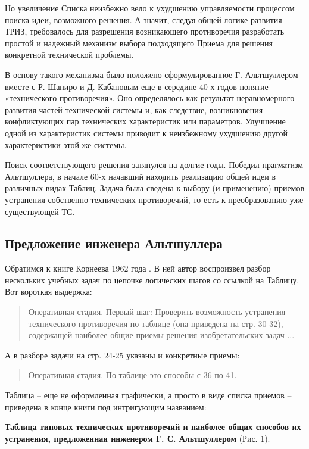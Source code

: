 \documentclass[11pt,a4paper]{article}
\begin{document}
Но увеличение Списка неизбежно вело к ухудшению управляемости процессом поиска
идеи, возможного решения. А значит, следуя общей логике развития ТРИЗ,
требовалось для разрешения возникающего противоречия разработать простой и
надежный механизм выбора подходящего Приема для решения конкретной технической
проблемы.

В основу такого механизма было положено сформулированное Г. Альтшуллером
вместе с Р. Шапиро и Д. Кабановым еще в середине 40-х годов понятие
«технического противоречия». Оно определялось как результат неравномерного
развития частей технической системы и, как следствие, возникновения
конфликтующих пар технических характеристик или параметров. Улучшение одной из
характеристик системы приводит к неизбежному ухудшению другой характеристики
этой же системы.

Поиск соответствующего решения затянулся на долгие годы. Победил прагматизм
Альтшуллера, в начале 60-х начавший находить реализацию общей идеи в различных
видах Таблиц. Задача была сведена к выбору (и применению) приемов устранения
собственно технических противоречий, то есть к преобразованию уже существующей
ТС.

\subsection*{Предложение инженера Альтшуллера}

Обратимся к книге Корнеева 1962 года \cite{Korneev1962}. В ней автор
воспроизвел разбор нескольких учебных задач по цепочке логических шагов со
ссылкой на Таблицу. Вот короткая выдержка:
\begin{quote}
  Оперативная стадия. Первый шаг: Проверить возможность устранения
  технического противоречия по таблице (она приведена на стр. 30-32),
  содержащей наиболее общие приемы решения изобретательских задач ...
\end{quote}
А в разборе задачи на стр. 24-25 указаны и конкретные приемы:
\begin{quote}
  Оперативная стадия. По таблице это способы с 36 по 41.
\end{quote}
Таблица -- еще не оформленная графически, а просто в виде списка приемов --
приведена в конце книги под интригующим названием:

\textbf{Таблица типовых технических противоречий и наиболее общих способов их
устранения, предложенная инженером Г. С. Альтшуллером} (Рис. 1).
\end{document}
